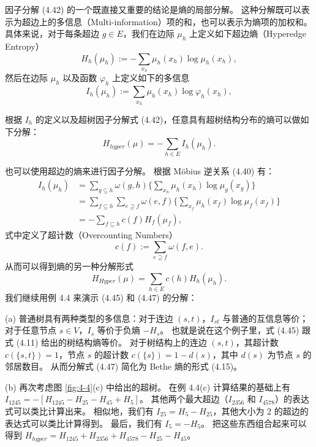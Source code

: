 因子分解 (4.42) 的一个既直接又重要的结论是熵的局部分解。
这种分解既可以表示为超边上的多信息（Multi-information）项的和，也可以表示为熵项的加权和。
具体来说，对于每条超边 $g \in E$，我们在边际 $\mu_h$ 上定义如下超边熵（Hyperedge Entropy）
\begin{equation}
    H_h(\mu_h) := -\sum_{x_h}\mu_h(x_h)\log\mu_h(x_h), 
\end{equation}
然后在边际 $\mu_h$ 以及函数 $\varphi_h$ 上定义如下的多信息
\begin{equation}
    I_h(\mu_h) := \sum_{x_h}\mu_h(x_h)\log\varphi_h(x_h), 
\end{equation}

根据 $I_h$ 的定义以及超树因子分解式 (4.42)，任意具有超树结构分布的熵可以做如下分解：
\begin{equation}
    H_{hyper}(\mu) = -\sum_{h \in E}I_h(\mu_h).
\end{equation}

也可以使用超边的熵来进行因子分解。
根据 M\"obius 逆关系 (4.40) 有：
\begin{align*}
    I_h(\mu_h) &= \sum_{g \subseteq h}\omega(g, h)\{\sum_{x_h}\mu_h(x_h)\log\mu_g(x_g)\} \\
    &= \sum_{f \subseteq h}\sum_{e \supseteq f}\omega(e, f)\{\sum_{x_f}\mu_h(x_f)\log\mu_f(x_f)\} \\
    &= -\sum_{f \subseteq h}c(f)H_f(\mu_f), 
\end{align*}
式中定义了超计数（Overcounting Numbers）
\begin{equation}
    c(f) := \sum_{e \supseteq f}\omega(f, e).
\end{equation}
从而可以得到熵的另一种分解形式
\begin{equation}
    H_{Hyper}(\mu) = \sum_{h \in E}c(h)H_h(\mu_h).
\end{equation}
我们继续用例 4.4 来演示 (4.45) 和 (4.47) 的分解：

\begin{tcolorbox}
\begin{exam}[超树结构的熵]

(a) 普通树具有两种类型的多信息：对于连边 $(s, t)$，$I_{st}$ 与普通的互信息等价；对于任意节点 $s \in V$，$I_s$ 等价于负熵 $-H_s$。
也就是说在这个例子里，式 (4.45) 跟式 (4.11) 给出的树结构熵等价。
对于树结构上的连边 $(s, t)$，其超计数 $c(\{s, t\}) = 1$，节点 $s$ 的超计数 $c(\{s\}) = 1-d(s)$，其中 $d(s)$ 为节点 $s$ 的邻居数目。
从而分解式 (4.47) 简化为 Bethe 熵的形式 (4.15)。

(b) 再次考虑图 \ref{fig:4-4}(c) 中给出的超树。
在例 4.4(c) 计算结果的基础上有 $I_{1245} = -[H_{1245}-H_{25}-H_{45}+H_5]$。
其他两个最大超边（$I_{2356}$ 和 $I_{4578}$）的表达式可以类比计算出来。
相似地，我们有 $I_{25} = H_5 - H_{25}$，其他大小为 2 的超边的表达式可以类比计算得到。
最后，我们有 $I_5 = -H_5$。
把这些东西组合起来可以得到 $H_{hyper} = H_{1245} + H_{2356} + H_{4578} - H_{25} - H_{45}$。

\end{exam}
\end{tcolorbox}

